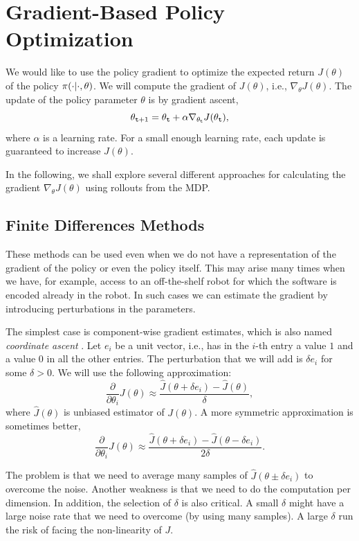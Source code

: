 \section{Gradient-Based Policy Optimization}
We would like to use the policy gradient to optimize the expected
return  $J(\theta)$ of the policy $\pi(\cdot|\cdot,\theta)$. We
will compute the gradient of $J(\theta)$, i.e., $\nabla_\theta
J(\theta)$. The update of the policy parameter $\theta$ is by gradient ascent,
\[
\theta_{{\tt t}+1}=\theta_{\tt t} + \alpha \nabla_{\theta_{\tt t}}
J(\theta_{\tt t}),
\]
where $\alpha$ is a learning rate. For a small enough learning rate, each update is guaranteed to increase $J(\theta)$.

In the following, we shall explore several different approaches for calculating the gradient $\nabla_{\theta} J(\theta)$ using rollouts from the MDP.




\subsection{Finite Differences Methods}

These methods can be used even when we do not have a representation
of the gradient of the policy or even the policy itself. This may
arise many times when we have, for example, access to an
off-the-shelf robot for which the software is encoded already in the
robot. In such cases we can estimate the gradient by introducing
perturbations in the parameters.

The simplest case is component-wise gradient estimates, which is also named \emph{coordinate ascent} . Let $e_i$ be
a unit vector, i.e., has in the $i$-th entry a value $1$ and a value
$0$ in all the other entries. The perturbation that we will add is
$\delta e_i$ for some $\delta >0$. We will use the following
approximation:
\[
\frac{\partial}{\partial \theta_i}J(\theta)\approx
\frac{\hat{J}(\theta+\delta e_i)-\hat{J}(\theta)}{\delta},
\]
where $\hat{J}(\theta)$ is unbiased estimator of $J(\theta)$. A more
symmetric approximation is sometimes better,
\[
\frac{\partial}{\partial \theta_i}J(\theta)\approx
\frac{\hat{J}(\theta+\delta e_i)-\hat{J}(\theta-\delta e_i
)}{2\delta}.
\]

The problem is that we need to average many samples of
$\hat{J}(\theta\pm\delta e_i)$ to overcome the noise. Another
weakness is that we need to do the computation per dimension. In
addition, the selection of $\delta$ is also critical. A small
$\delta$ might have a large noise rate that we need to overcome (by
using many samples). A large $\delta$ run the risk of facing the
non-linearity of $J$.

